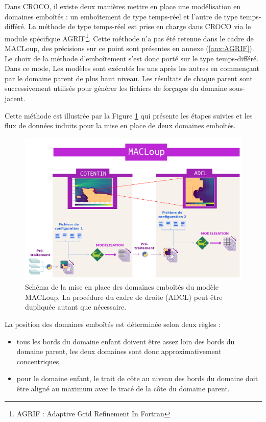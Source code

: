\documentclass[10pt,a4paper,titlepage]{article}
\begin{document}
Dans CROCO, il existe deux manières mettre en place une modélisation en domaines emboîtés : un emboîtement de type temps-réel et l'autre de type temps-différé.
La méthode de type temps-réel est prise en charge dans CROCO via le module spécifique AGRIF\footnote{AGRIF : Adaptive Grid Refinement In Fortran}.
Cette méthode n'a pas été retenue dans le cadre de MACLoup, des précisions sur ce point sont présentes en annexe (\ref{anx:AGRIF}).
Le choix de la méthode d'emboîtement s'est donc porté sur le type temps-différé.
Dans ce mode, Les modèles sont exécutés les uns après les autres en commençant par le domaine parent de plus haut niveau.
Les résultats de chaque parent sont successivement utilisés pour générer les fichiers de forçages du domaine sous-jacent.

Cette méthode est illustrée par la Figure \ref{fig:imbrication_workflow} qui présente les étapes suivies et les flux de données induits pour la mise en place de deux domaines emboîtés.

\begin{figure}[H]
    \centering
    \includegraphics[scale=0.3]{../images/workflow/multi_grid.pdf}
    \caption{Schéma de la mise en place des domaines emboîtés du modèle MACLoup. La procédure du cadre de droite (ADCL) peut être dupliquée autant que nécessaire.}
    \label{fig:imbrication_workflow}
\end{figure}


La position des domaines emboîtés est déterminée selon deux règles :
\begin{itemize}
	\item tous les bords du domaine enfant doivent être assez loin des bords du domaine parent, les deux domaines sont donc approximativement concentriques,
	\item pour le domaine enfant, le trait de côte au niveau des bords du domaine doit être aligné au maximum avec le tracé de la côte du domaine parent.
\end{itemize}
\end{document}
